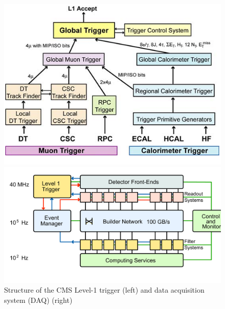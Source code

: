 \begin{figure}[htbp]
\centering
\begin{minipage}[t]{0.49\textwidth}
  \includegraphics[width=\textwidth]{plots/CMS/L1Schema.png}
\end{minipage}
\begin{minipage}[t]{0.49\textwidth}
\includegraphics[width=\textwidth]{plots/CMS/DAQ.png}
\end{minipage}
\caption{Structure of the CMS Level-1 trigger (left) and data acquisition system (DAQ) (right)}
\label{fig:L1Daq}
\end{figure}

